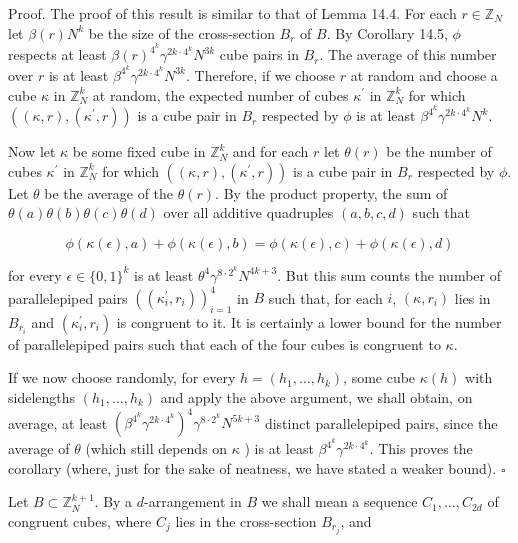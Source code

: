 \documentclass[10pt]{article}
\begin{document}
Proof. The proof of this result is similar to that of Lemma 14.4. For each $r \in \mathbb{Z}_{N}$ let $\beta(r) N^{k}$ be the size of the cross-section $B_{r}$ of $B$. By Corollary 14.5, $\phi$ respects at least $\beta(r)^{4^{k}} \gamma^{2 k \cdot 4^{k}} N^{3 k}$ cube pairs in $B_{r}$. The average of this number over $r$ is at least $\beta^{4^{k}} \gamma^{2 k \cdot 4^{k}} N^{3 k}$. Therefore, if we choose $r$ at random and choose a cube $\kappa$ in $\mathbb{Z}_{N}^{k}$ at random, the expected number of cubes $\kappa^{\prime}$ in $\mathbb{Z}_{N}^{k}$ for which $\left((\kappa, r),\left(\kappa^{\prime}, r\right)\right)$ is a cube pair in $B_{r}$ respected by $\phi$ is at least $\beta^{4^{k}} \gamma^{2 k \cdot 4^{k}} N^{k}$.

Now let $\kappa$ be some fixed cube in $\mathbb{Z}_{N}^{k}$ and for each $r$ let $\theta(r)$ be the number of cubes $\kappa^{\prime}$ in $\mathbb{Z}_{N}^{k}$ for which $\left((\kappa, r),\left(\kappa^{\prime}, r\right)\right)$ is a cube pair in $B_{r}$ respected by $\phi$. Let $\theta$ be the average of the $\theta(r)$. By the product property, the sum of $\theta(a) \theta(b) \theta(c) \theta(d)$ over all additive quadruples $(a, b, c, d)$ such that

$$
\phi(\kappa(\epsilon), a)+\phi(\kappa(\epsilon), b)=\phi(\kappa(\epsilon), c)+\phi(\kappa(\epsilon), d)
$$

for every $\epsilon \in\{0,1\}^{k}$ is at least $\theta^{4} \gamma^{8\cdot2^{k}} N^{4 k+3}$. But this sum counts the number of parallelepiped pairs $\left(\left(\kappa_{i}^{\prime}, r_{i}\right)\right)_{i=1}^{4}$ in $B$ such that, for each $i$, $(\kappa,r_{i})$ lies in $B_{r_{i}}$ and $\left(\kappa_{i}^{\prime}, r_{i}\right)$ is congruent to it. It is certainly a lower bound for the number of parallelepiped pairs such that each of the four cubes is congruent to $\kappa$.

If we now choose randomly, for every $h=\left(h_{1}, \ldots, h_{k}\right)$, some cube $\kappa(h)$ with sidelengths $\left(h_{1}, \ldots, h_{k}\right)$ and apply the above argument, we shall obtain, on average, at least $\left(\beta^{4^{k}} \gamma^{2 k \cdot 4^{k}}\right)^{4} \gamma^{8\cdot2^{k}} N^{5 k+3}$ distinct parallelepiped pairs, since the average of $\theta$ (which still depends on $\kappa$ ) is at least $\beta^{4^{k}} \gamma^{2 k \cdot 4^{k}}$. This proves the corollary (where, just for the sake of neatness, we have stated a weaker bound). \(\square\)

Let $B \subset \mathbb{Z}_{N}^{k+1}$. By a $d$-arrangement in $B$ we shall mean a sequence $C_{1}, \ldots, C_{2 d}$ of congruent cubes, where $C_{j}$ lies in the cross-section $B_{r_{j}}$, and
\end{document}
